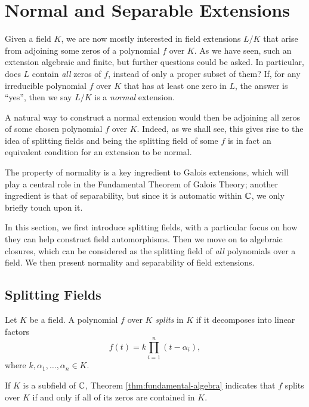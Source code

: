 \section{Normal and Separable Extensions}

Given a field $K$, we are now mostly interested in field extensions $L/K$ that arise from adjoining some zeros of a polynomial $f$ over $K$. As we have seen, such an extension algebraic and finite, but further questions could be asked. In particular, does $L$ contain \textit{all} zeros of $f$, instead of only a proper subset of them? If,  for any irreducible polynomial $f$ over $K$ that has at least one zero in $L$, the answer is ``yes'', then we say $L/K$ is a \textit{normal} extension. 

A natural way to construct a normal extension would then be adjoining all zeros of some chosen polynomial $f$ over $K$. Indeed, as we shall see, this gives rise to the idea of splitting fields and being the splitting field of some $f$ is in fact an equivalent condition for an extension to be normal. 

The property of normality is a key ingredient to Galois extensions, which will play a central role in the Fundamental Theorem of Galois Theory; another ingredient is that of separability, but since it is automatic within $\mathbb C$, we only briefly touch upon it. 

In this section, we first introduce splitting fields, with a particular focus on how they can help construct field automorphisms. Then we move on to algebraic closures, which can be considered as the splitting field of \textit{all} polynomials over a field. We then present normality and separability of field extensions. 




\subsection{Splitting Fields}
\begin{definition}
    Let $K$ be a field. A polynomial $f$ over $K$ \textit{splits} in $K$ if it decomposes into linear factors $$
    f(t) = k \prod _{i=1} ^n (t - \alpha_i),
    $$
    where $k, \alpha_1, \ldots, \alpha_n \in K$. 
\end{definition}
If $K$ is a subfield of $\mathbb C$, Theorem \ref{thm:fundamental-algebra} indicates that $f$ splits over $K$ if and only if all of its zeros are contained in $K$. 

